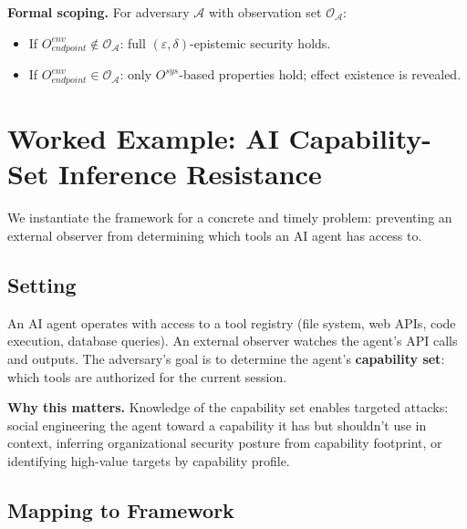 \documentclass[11pt,a4paper]{article}
\begin{document}
\textbf{Formal scoping.} For adversary $\mathcal{A}$ with observation set $\mathcal{O}_\mathcal{A}$:
\begin{itemize}
  \item If $O^{env}_{endpoint} \notin \mathcal{O}_\mathcal{A}$: full $(\varepsilon, \delta)$-epistemic security holds.
  \item If $O^{env}_{endpoint} \in \mathcal{O}_\mathcal{A}$: only $O^{sys}$-based properties hold; effect existence is revealed.
\end{itemize}

\section{Worked Example: AI Capability-Set Inference Resistance}

We instantiate the framework for a concrete and timely problem: preventing an external observer from determining which tools an AI agent has access to.

\subsection{Setting}

An AI agent operates with access to a tool registry (file system, web APIs, code execution, database queries). An external observer watches the agent's API calls and outputs. The adversary's goal is to determine the agent's \textbf{capability set}: which tools are authorized for the current session.

\textbf{Why this matters.} Knowledge of the capability set enables targeted attacks: social engineering the agent toward a capability it has but shouldn't use in context, inferring organizational security posture from capability footprint, or identifying high-value targets by capability profile.

\subsection{Mapping to Framework}
\end{document}
